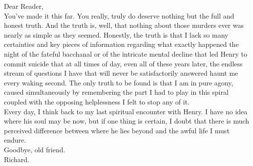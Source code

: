 \documentclass[11pt]{article}
\begin{document}
Dear Reader, \\

You've made it this far. You really, truly do deserve nothing but the full and honest truth. And the truth is, well, that nothing about those murders ever was nearly as simple as they seemed. Honestly, the truth is that I lack so many certainties and key pieces of information regarding what exactly happened the night of the fateful bacchanal or of the intricate mental decline that led Henry to commit suicide that at all times of day, even all of these years later, the endless stream of questions I have that will never be satisfactorily answered haunt me every waking second. The only truth to be found is that I am in pure agony, caused simultaneously by remembering the part I had to play in this spiral coupled with the opposing helplessness I felt to stop any of it. \\

Every day, I think back to my last spiritual encounter with Henry. I have no idea where his soul may be now, but if one thing is certain, I doubt that there is much perceived difference between where he lies beyond and the awful life I must endure. \\

Goodbye, old friend. \\

Richard.
\end{document}
